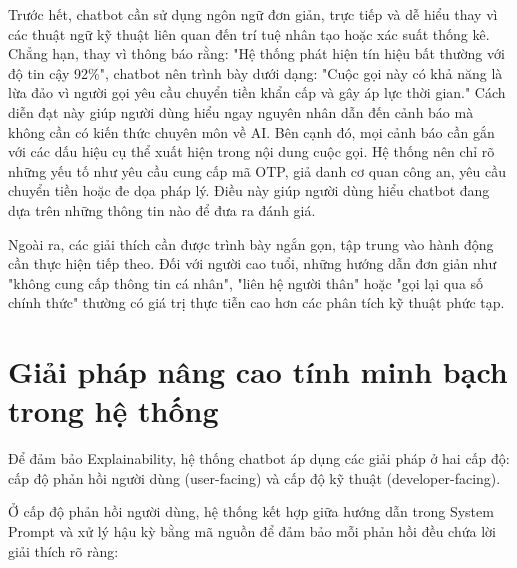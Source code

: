 Trước hết, chatbot cần sử dụng ngôn ngữ đơn giản, trực tiếp và dễ hiểu thay vì các thuật ngữ kỹ thuật liên quan đến trí tuệ nhân tạo hoặc xác suất thống kê. Chẳng hạn, thay vì thông báo rằng:
"Hệ thống phát hiện tín hiệu bất thường với độ tin cậy 92\%", chatbot nên trình bày dưới dạng:
"Cuộc gọi này có khả năng là lừa đảo vì người gọi yêu cầu chuyển tiền khẩn cấp và gây áp lực thời gian."
Cách diễn đạt này giúp người dùng hiểu ngay nguyên nhân dẫn đến cảnh báo mà không cần có kiến thức chuyên môn về AI. 
Bên cạnh đó, mọi cảnh báo cần gắn với các dấu hiệu cụ thể xuất hiện trong nội dung cuộc gọi. Hệ thống nên chỉ rõ những yếu tố như yêu cầu cung cấp mã OTP, giả danh cơ quan công an, yêu cầu chuyển tiền hoặc đe dọa pháp lý. Điều này giúp người dùng hiểu chatbot đang dựa trên những thông tin nào để đưa ra đánh giá.

Ngoài ra, các giải thích cần được trình bày ngắn gọn, tập trung vào hành động cần thực hiện tiếp theo. Đối với người cao tuổi, những hướng dẫn đơn giản như "không cung cấp thông tin cá nhân", "liên hệ người thân" hoặc "gọi lại qua số chính thức" thường có giá trị thực tiễn cao hơn các phân tích kỹ thuật phức tạp.

\section{Giải pháp nâng cao tính minh bạch trong hệ thống}
Để đảm bảo Explainability, hệ thống chatbot áp dụng các giải pháp ở hai cấp độ: cấp độ phản hồi người dùng (user-facing) và cấp độ kỹ thuật (developer-facing).

Ở cấp độ phản hồi người dùng, hệ thống kết hợp giữa hướng dẫn trong System Prompt và xử lý hậu kỳ bằng mã nguồn để đảm bảo mỗi phản hồi đều chứa lời giải thích rõ ràng:

